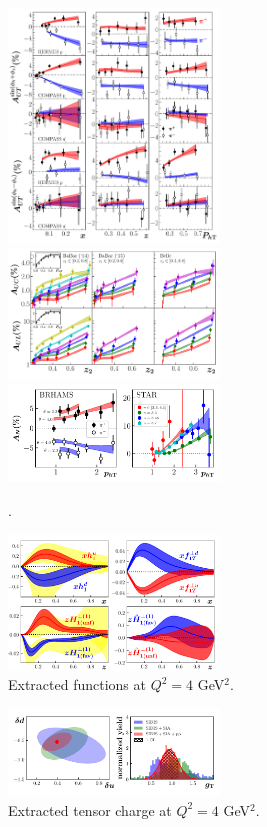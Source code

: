 \documentclass[twocolumn,prl,aps,superscriptaddress
               ,footinbib,amsfonts,amsmath,amssymb,showpacs]{revtex4-1}
\begin{document}
\begin{figure}[h!]
\includegraphics[width=0.5\textwidth]{gallery2/sidis.pdf}
\includegraphics[width=0.5\textwidth]{gallery2/sia.pdf}
\includegraphics[width=0.5\textwidth]{gallery2/an.pdf}
\caption{.} 
\label{f:SIDIS_Sivers}
\end{figure}

\begin{figure}[h!]
\includegraphics[width=0.5\textwidth]{gallery2/qcf.pdf}
\caption{Extracted functions at $Q^2=4$ GeV$^2$.} 
\label{f:qcf}
\end{figure}

\begin{figure}[h!]
\includegraphics[width=0.5\textwidth]{gallery2/gT.pdf}
\caption{Extracted tensor charge at $Q^2=4$ GeV$^2$.} 
\label{f:gT}
\end{figure}
\end{document}
